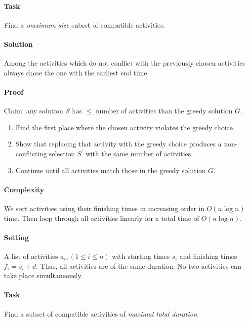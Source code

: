 \paragraph{Task} 
Find a \textit{maximum size} subset of compatible activities.

\paragraph{Solution} 
Among the activities which do not conflict with the previously chosen activities always chose
the one with the earliest end time.

\paragraph{Proof} 
Claim: any solution \(S\) has \(\leq\) number of activities than the greedy solution \(G\).
\begin{enumerate}
    \item Find the first place where the chosen activity violates the greedy choice.
    \item Show that replacing that activity with the greedy choice produces a non-conflicting 
    selection \(S^\prime\) with the same number of activities. 
    \item Continue until all activities match those in the greedy solution \(G\).
\end{enumerate}

\paragraph{Complexity} 
We sort activities using their finishing times in increasing order in \(O(n\log n)\) time.
Then loop through all activities linearly for a total time of \(O(n\log n)\).

\paragraph{Setting} A list of activities \(a_i, (1 \leq i \leq n)\) with starting times \(s_i\)
and finishing times \(f_i = s_i + d\). Thus, all activities are of  the same duration. No two
activities can take place simultaneously.

\paragraph{Task} Find a subset of compatible activities of \textit{maximal total duration}.

